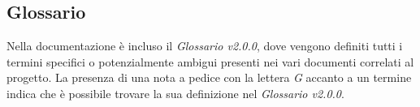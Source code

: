 \subsection{Glossario}
Nella documentazione è incluso il \textit{Glossario v2.0.0}, dove vengono definiti tutti i termini specifici o potenzialmente ambigui presenti nei vari documenti correlati al progetto. La presenza di una nota a pedice con la lettera \textit{G} accanto a un termine indica che è possibile trovare la sua definizione nel \textit{Glossario v2.0.0}.  
